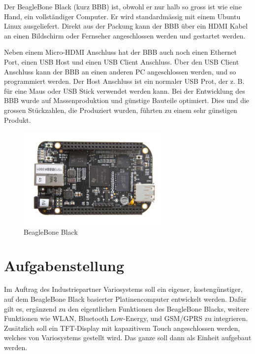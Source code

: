 Der BeagleBone Black (kurz BBB) ist, obwohl er nur halb so gross ist wie eine Hand, ein vollständiger Computer. Er wird standardmässig mit einem Ubuntu Linux ausgeliefert. Direkt aus der Packung kann der BBB über ein HDMI Kabel an einen Bildschirm oder Fernseher angeschlossen werden und gestartet werden.

Neben einem Micro-HDMI Anschluss hat der BBB auch noch einen Ethernet Port, einen USB Host und einen USB Client Anschluss. Über den USB Client Anschluss kann der BBB an einen anderen PC angeschlossen werden, und so programmiert werden. Der Host Anschluss ist ein normaler USB Prot, der z. B. für eine Maus oder USB Stick verwendet werden kann.
Bei der Entwicklung des BBB wurde auf Massenproduktion und günstige Bauteile optimiert. Dies und die grossen Stückzahlen, die Produziert wurden, führten zu einem sehr günstigen Produkt.

\begin{figure}[!ht]
\centering
\includegraphics[angle=0,height=5cm]{images/BeagleBoneBlack.jpg}
\caption{BeagleBone Black}
\label{BeagleBoneBlack}
\end{figure}


\section{Aufgabenstellung}
Im Auftrag des Industriepartner Variosystems soll ein eigener, kostengünstiger, auf dem BeagleBone Black basierter Platinencomputer entwickelt werden. Dafür gilt es, ergänzend zu den eigentlichen Funktionen des BeagleBone Blacks, weitere Funktionen wie WLAN, Bluetooth Low-Energy, und GSM/GPRS zu integrieren. Zusätzlich soll ein TFT-Display mit kapazitivem Touch angeschlossen werden, welches von Variosystems gestellt wird. Das ganze soll dann als Einheit aufgebaut werden.

